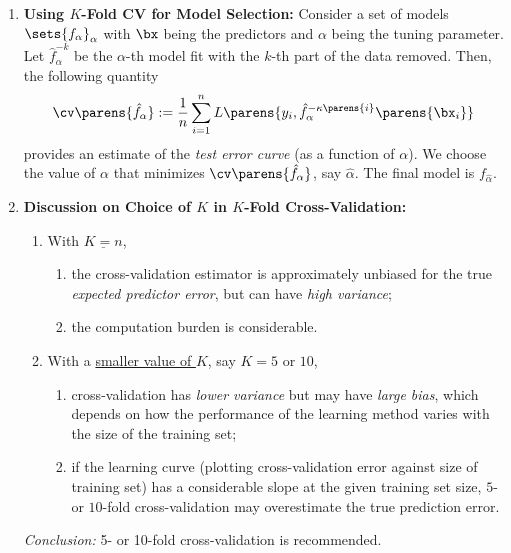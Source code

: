 \documentclass[12pt]{article}
\begin{document}
\begin{enumerate}[label=\textbf{\arabic*.}]
\begin{enumerate}
	\end{enumerate}
	
	\item \textbf{Using $K$-Fold CV for Model Selection:} Consider a set of models $\sets{ f_{\alpha} }_{\alpha}$ with $\bx$ being the predictors and $\alpha$ being the tuning parameter. Let $\hat{f}_{\alpha}^{-k}$ be the $\alpha$-th model fit with the $k$-th part of the data removed. Then, the following quantity 
	\begin{align}
		\cv \parens{\hat{f}_{\alpha}} := \frac{1}{n} \sum_{i=1}^n L \parens{y_i, \hat{f}_{\alpha}^{-\kappa \parens{i}} \parens{\bx_i}}
	\end{align}
	provides an estimate of the \emph{test error curve} (as a function of $\alpha$). We choose the value of $\alpha$ that minimizes $\cv \parens{\hat{f}_{\alpha}}$, say $\hat{\alpha}$. The final model is $f_{\hat{\alpha}}$. 
	
	\item \textbf{Discussion on Choice of $K$ in $K$-Fold Cross-Validation:} 
	\begin{enumerate}
		\item With $\underline{K = n}$, 
		\begin{enumerate}
			\item the cross-validation estimator is approximately unbiased for the true \emph{expected predictor error}, but can have \emph{high variance}; 
			\item the computation burden is considerable. 
		\end{enumerate}
		
		\item With a \underline{smaller value of $K$}, say $K = 5$ or $10$, 
		\begin{enumerate}
			\item cross-validation has \emph{lower variance} but may have \emph{large bias}, which depends on how the performance of the learning method varies with the size of the training set; 
			\item if the learning curve (plotting cross-validation error against size of training set) has a considerable slope at the given training set size, $5$- or $10$-fold cross-validation may overestimate the true prediction error. 
		\end{enumerate}
	\end{enumerate}
	
	\textit{Conclusion:} 5- or 10-fold cross-validation is recommended. 
	

\end{enumerate}
\end{document}
